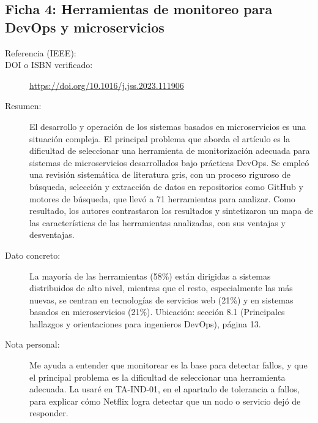\subsection{Ficha 4: Herramientas de monitoreo para DevOps y microservicios}
\begin{description}
  \item[Referencia (IEEE):] 
  \item[DOI o ISBN verificado:] \url{https://doi.org/10.1016/j.jss.2023.111906}
  \item[Resumen:] El desarrollo y operación de los sistemas basados en microservicios es una situación compleja. El principal problema que aborda el artículo es la dificultad de seleccionar una herramienta de monitorización adecuada para sistemas de microservicios desarrollados bajo prácticas DevOps. Se empleó una revisión sistemática de literatura gris, con un proceso riguroso de búsqueda, selección y extracción de datos en repositorios como GitHub y motores de búsqueda, que llevó a 71 herramientas para analizar. Como resultado, los autores contrastaron los resultados y sintetizaron un mapa de las características de las herramientas analizadas, con sus ventajas y desventajas.
  \item[Dato concreto:] La mayoría de las herramientas (58\%) están dirigidas a sistemas distribuidos de alto nivel, mientras que el resto, especialmente las más nuevas, se centran en tecnologías de servicios web (21\%) y en sistemas basados en microservicios (21\%). Ubicación: sección 8.1 (Principales hallazgos y orientaciones para ingenieros DevOps), página 13.
  \item[Nota personal:] Me ayuda a entender que monitorear es la base para detectar fallos, y que el principal problema es la dificultad de seleccionar una herramienta adecuada.
La usaré en TA-IND-01, en el apartado de tolerancia a fallos, para explicar cómo Netflix logra detectar que un nodo o servicio dejó de responder.
\end{description}

